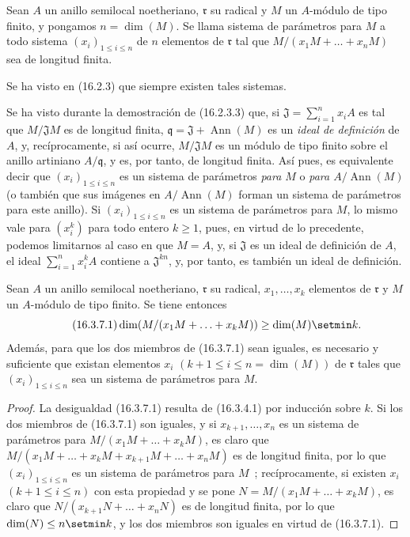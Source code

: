 \begin{definition}[16.3.6]
\label{0.16.3.6-es}
Sean $A$ un anillo semilocal noetheriano, $\mathfrak{r}$ su radical y $M$ un
$A$-módulo de tipo finito, y pongamos $n=\dim(M)$. Se llama sistema de
parámetros para $M$ a todo sistema $(x_i)_{1\leq i\leq n}$ de $n$ elementos de
$\mathfrak{r}$ tal que $M/(x_1M+\ldots+x_nM)$ sea de longitud finita.
\end{definition}

Se ha visto en (16.2.3) que siempre existen tales sistemas.

Se ha visto durante la demostración de (16.2.3.3) que, si
$\mathfrak{J}=\sum_{i=1}^n x_iA$ es tal que $M/\mathfrak{J}M$ es de
longitud finita, $\mathfrak{q}=\mathfrak{J}+\operatorname{Ann}(M)$ es un
\emph{ideal de definición} de $A$, y, recíprocamente, si así ocurre,
$M/\mathfrak{J}M$ es un módulo de tipo finito sobre el anillo artiniano
$A/\mathfrak{q}$, y es, por tanto, de longitud finita. Así pues, es equivalente decir
que $(x_i)_{1\leq i\leq n}$ es un sistema de parámetros \emph{para $M$} o
\emph{para $A/\operatorname{Ann}(M)$} (o también que sus imágenes en
$A/\operatorname{Ann}(M)$ forman un sistema de parámetros para este anillo).
Si $(x_i)_{1\leq i\leq n}$ es un sistema de parámetros para $M$, lo mismo vale
para $(x_i^k)$ para todo entero $k\geq1$, pues, en virtud de lo precedente,
podemos limitarnos al caso en que $M=A$, y, si $\mathfrak{J}$ es un ideal de
definición de $A$, el ideal $\sum_{i=1}^n x_i^kA$ contiene a
$\mathfrak{J}^{kn}$, y, por tanto, es también un ideal de definición.

\begin{proposition}[16.3.7]
\label{0.16.3.7-es}
Sean $A$ un anillo semilocal noetheriano, $\mathfrak{r}$ su radical,
$x_1,\ldots,x_k$ elementos de $\mathfrak{r}$ y $M$ un $A$-módulo de tipo
finito. Se tiene entonces
\begin{equation}
\label{0.16.3.7.1-es}
\tag{16.3.7.1}
  \dim(M/(x_1M+\ldots+x_kM))\geq\dim(M)\setmin k.
\end{equation}
Además, para que los dos miembros de \textup{(16.3.7.1)} sean iguales, es necesario y
suficiente que existan elementos $x_i$
$(k+1\leq i\leq n=\dim(M))$ de $\mathfrak{r}$ tales que
$(x_i)_{1\leq i\leq n}$ sea un sistema de parámetros para $M$.
\end{proposition}

\begin{proof}
La desigualdad (16.3.7.1) resulta de (16.3.4.1) por inducción sobre $k$. Si los
dos miembros de (16.3.7.1) son iguales, y si $x_{k+1},\ldots,x_n$ es un
sistema de parámetros para $M/(x_1M+\ldots+x_kM)$, es claro que
$M/(x_1M+\ldots+x_kM+x_{k+1}M+\ldots+x_nM)$ es de longitud finita, por lo que
$(x_i)_{1\leq i\leq n}$ es un sistema de parámetros para $M$~;
recíprocamente, si existen $x_i$ $(k+1\leq i\leq n)$ con esta propiedad y se
pone $N=M/(x_1M+\ldots+x_kM)$, es claro que
$N/(x_{k+1}N+\ldots+x_nN)$ es de longitud finita, por lo que
$\dim(N)\leq n\setmin k$, y los dos miembros son iguales en virtud de (16.3.7.1).
\end{proof}

